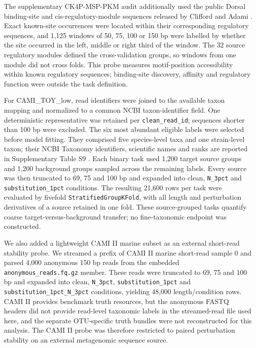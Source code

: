 The supplementary CK4P-MSP-PKM audit additionally used the public Dorsal binding-site and cis-regulatory-module sequences released by Clifford and Adami \citep{CliffordAdami2016Dryad}. Exact known-site occurrences were located within their corresponding regulatory sequences, and 1,125 windows of 50, 75, 100 or 150 bp were labelled by whether the site occurred in the left, middle or right third of the window. The 32 source regulatory modules defined the cross-validation groups, so windows from one module did not cross folds. This probe measures motif-position accessibility within known regulatory sequences; binding-site discovery, affinity and regulatory function were outside the task definition.

For CAMI\_TOY\_low, read identifiers were joined to the available taxon mapping and normalized to a common NCBI taxon-identifier field. One deterministic representative was retained per \texttt{clean\_read\_id}; sequences shorter than 100 bp were excluded. The six most abundant eligible labels were selected before model fitting. They comprised five species-level taxa and one strain-level taxon; their NCBI Taxonomy identifiers, scientific names and ranks are reported in Supplementary Table S9 \citep{Schoch2020Taxonomy}. Each binary task used 1,200 target source groups and 1,200 background groups sampled across the remaining labels. Every source was then truncated to 69, 75 and 100 bp and expanded into clean, \texttt{N\_3pct} and \texttt{substitution\_1pct} conditions. The resulting 21,600 rows per task were evaluated by fivefold \texttt{StratifiedGroupKFold}, with all length and perturbation derivatives of a source retained in one fold. These source-grouped tasks quantify coarse target-versus-background transfer; no fine-taxonomic endpoint was constructed.

We also added a lightweight CAMI II marine subset as an external short-read stability probe. We streamed a prefix of CAMI II marine short-read sample 0 and parsed 4,000 anonymous 150 bp reads from the embedded \texttt{anonymous\_reads.fq.gz} member. These reads were truncated to 69, 75 and 100 bp and expanded into clean, \texttt{N\_3pct}, \texttt{substitution\_1pct} and \texttt{substitution\_1pct\_N\_3pct} conditions, yielding 48,000 length/condition rows. CAMI II provides benchmark truth resources, but the anonymous FASTQ headers did not provide read-level taxonomic labels in the streamed-read file used here, and the separate OTU-specific truth bundles were not reconstructed for this analysis. The CAMI II probe was therefore restricted to paired perturbation stability on an external metagenomic sequence source.

